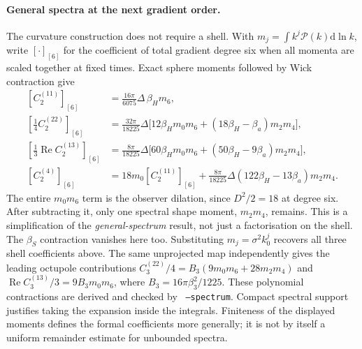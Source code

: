 \documentclass[11pt]{article}
\theoremstyle{definition}
\theoremstyle{remark}
\newcommand{\dd}{\mathrm{d}}
\newcommand{\code}[1]{\texttt{#1}}
\begin{document}
\paragraph{General spectra at the next gradient order.}
The curvature construction does not require a shell. With
$m_j=\int k^j\mathcal P(k)\dd\ln k$, write $[\cdot]_{[6]}$ for the coefficient of total
gradient degree six when all momenta are scaled together at fixed times. Exact sphere
moments followed by Wick contraction give
\begin{equation}\label{eq:general-next}
\boxed{\begin{aligned}
{}[C_2^{(11)}]_{[6]}&=\tfrac{16\pi}{6075}\Delta\,\beta_H m_6,\\
[\tfrac14C_2^{(22)}]_{[6]}&=\tfrac{32\pi}{18225}\Delta
\big[12\beta_H m_0m_6+(18\beta_H-\beta_a)m_2m_4\big],\\
[\tfrac13\operatorname{Re}C_2^{(13)}]_{[6]}&=\tfrac{8\pi}{18225}\Delta
\big[60\beta_H m_0m_6+(50\beta_H-9\beta_a)m_2m_4\big],\\
[C_2^{(4)}]_{[6]}&=18m_0[C_2^{(11)}]_{[6]}
+\tfrac{8\pi}{18225}\Delta(122\beta_H-13\beta_a)m_2m_4.
\end{aligned}}
\end{equation}
The entire $m_0m_6$ term is the observer dilation, since $D^2/2=18$ at degree six.
After subtracting it, only one spectral shape moment, $m_2m_4$, remains. This is a
simplification of the \emph{general-spectrum} result, not just a factorisation on the shell.
The $\beta_S$ contraction vanishes here too. Substituting $m_j=\sigma^2k_0^j$ recovers all
three shell coefficients above. The same unprojected map independently gives the leading
octupole contributions $C_3^{(22)}/4=B_3(9m_0m_6+28m_2m_4)$ and
$\operatorname{Re}C_3^{(13)}/3=9B_3m_0m_6$, where $B_3=16\pi\beta_3^2/1225$.
These polynomial contractions are derived and checked by
\ \code{--spectrum}. Compact spectral support justifies taking
the expansion inside the integrals. Finiteness of the displayed moments defines the formal
coefficients more generally; it is not by itself a uniform remainder estimate for
unbounded spectra.
\end{document}
